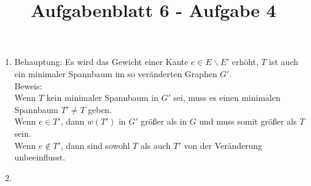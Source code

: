 \documentclass{article}
\title{Aufgabenblatt 6 - Aufgabe 4}
\author{}
\begin{document}
\maketitle

\begin{enumerate}
\item[(a)]
Behauptung:
Es wird das Gewicht einer Kante $e \in E \backslash E'$ erhöht,
$T$ ist auch ein minimaler Spannbaum im so veränderten Graphen $G'$.\\
Beweis:\\
Wenn $T$ kein minimaler Spannbaum in $G'$ sei, muss es einen minimalen Spannbaum $T' \neq T$ geben.\\
Wenn $e \in T'$, dann $w(T')$ in $G'$ gr{\"o}{\ss}er als in $G$ und muss somit gr{\"o}{\ss}er als $T$ sein.\\
Wenn $e \notin T'$, dann sind sowohl $T$ als auch $T'$ von der Ver{\"a}nderung unbeeinflusst.
\item[(b)]


\end{enumerate}
\end{document}
